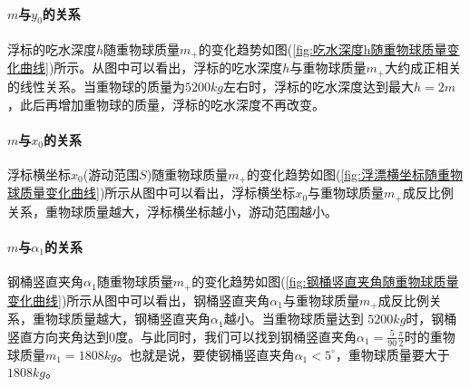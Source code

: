             \paragraph{$m$与$y_0$的关系}浮标的吃水深度$h$随重物球质量$m_+$的变化趋势如图(\ref{fig:吃水深度h随重物球质量变化曲线})所示。从图中可以看出，浮标的吃水深度$h$与重物球质量$m_+$大约成正相关的线性关系。当重物球的质量为$5200kg$左右时，浮标的吃水深度达到最大$h=2m$，此后再增加重物球的质量，浮标的吃水深度不再改变。
            \paragraph{$m$与$x_0$的关系}浮标横坐标$x_0$(游动范围$S$)随重物球质量$m_+$的变化趋势如图(\ref{fig:浮漂横坐标随重物球质量变化曲线})所示从图中可以看出，浮标横坐标$x_0$与重物球质量$m_+$成反比例关系，重物球质量越大，浮标横坐标越小，游动范围越小。
            \paragraph{$m$与$\alpha_1$的关系}钢桶竖直夹角$\alpha_1$随重物球质量$m_+$的变化趋势如图(\ref{fig:钢桶竖直夹角随重物球质量变化曲线})所示从图中可以看出，钢桶竖直夹角$\alpha_1$与重物球质量$m_+$成反比例关系，重物球质量越大，钢桶竖直夹角$\alpha_1$越小。当重物球质量达到 $5200kg $时，钢桶竖直方向夹角达到$ 0 $度。与此同时，我们可以找到钢桶竖直夹角$\alpha_1=\frac{5}{90}\frac{\pi}{2}$时的重物球质量$m_1 = 1808kg$。也就是说，要使钢桶竖直夹角$\alpha_1 <5^\circ$，重物球质量要大于$1808kg $。

